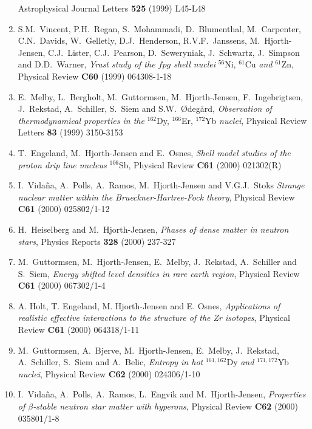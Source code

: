 \begin{enumerate}
    Astrophysical Journal Letters {\bf 525} (1999) L45-L48
\item S.M.\ Vincent, P.H.\ Regan, S.\ Mohammadi, D.\ Blumenthal,
      M.\ Carpenter, C.N.\ Davids, W.\ Gelletly, D.J.\ Henderson,
      R.V.F.\ Janssens, M.\ Hjorth-Jensen, C.J.\ Lister, C.J.\ Pearson,
      D.\ Seweryniak, J.\ Schwartz, J.\ Simpson and D.D.\ Warner,
      {\em Yrast study of the $fpg$ shell nuclei} $^{56}$Ni, $^{61}$Cu
      {\em and} $^{61}$Zn, Physical Review {\bf C60} (1999) 064308-1-18
\item  E.\ Melby, L.\ Bergholt, M.\ Guttormsen, M.\ Hjorth-Jensen,
       F.\ Ingebrigtsen, J.\ Rekstad, A.\ Schiller, S.\ Siem and
       S.W.\ \O deg\aa rd,  
       {\em Observation of thermodynamical properties in the} 
       $^{162}$Dy, $^{166}$Er, $^{172}$Yb {\em nuclei},
       Physical Review Letters {\bf 83} (1999) 3150-3153
\item T.~Engeland, M.~Hjorth-Jensen and E.~Osnes,
    {\em Shell model studies of the proton drip line nucleus} $^{106}$Sb,
    Physical Review {\bf C61} (2000) 021302(R)
\item I.\ Vida\~na, A.\ Polls, A.\ Ramos,   
       M.\ Hjorth-Jensen and V.G.J.\ Stoks
    {\em Strange nuclear matter within the Brueckner-Hartree-Fock theory},
    Physical Review {\bf C61} (2000) 025802/1-12
\item 
    H.\ Heiselberg and M.\ Hjorth-Jensen,
    {\em Phases of dense matter in neutron stars}, 
    Physics Reports {\bf 328} (2000) 237-327
\item  M.\ Guttormsen, M.\ Hjorth-Jensen,
       E.\ Melby,  J.\ Rekstad, A.\ Schiller and S.\ Siem,  
       {\em Energy shifted level densities in rare earth region},
       Physical Review {\bf C61} (2000)  067302/1-4
\item
    A. Holt, T. Engeland, M. Hjorth-Jensen and E. Osnes,
    {\em Applications of realistic effective interactions to the structure
         of the Zr isotopes},
    Physical Review {\bf C61} (2000) 064318/1-11
\item  M.\ Guttormsen, A.\ Bjerve, M.\ Hjorth-Jensen,
       E.\ Melby,  J.\ Rekstad, A.\ Schiller, S.\ Siem and A.~Belic,  
       {\em Entropy in hot} 
       $^{161,162}$Dy {\em and} $^{171,172}$Yb {\em nuclei},
       Physical Review {\bf C62} (2000) 024306/1-10
\item I.\ Vida\~na, A.\ Polls, A.\ Ramos, L.\ Engvik and  
       M.\ Hjorth-Jensen,
    {\em Properties of $\beta$-stable neutron star matter with hyperons},
    Physical Review {\bf C62} (2000) 035801/1-8

\end{enumerate}

